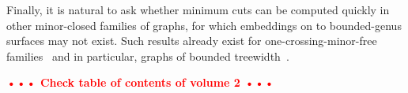\documentclass[natbib]{svcyclop}
\def\NOTE#1{\textcolor{Red}{\textbf{\textsf{••• #1 •••}}}}
\begin{document}
Finally, it is natural to ask whether minimum cuts can be computed quickly in other minor-closed families of graphs, for which embeddings on to bounded-genus surfaces may not exist.
Such results already exist for one-crossing-minor-free families~\cite{ce-fog-13} and in particular, graphs of bounded treewidth~\cite{hknr-cmfnc-98}.



\CrossRef

\NOTE{Check table of contents of volume 2}


\nocite{bk-amfdp-09, hkrs-fspap-97, k-msspp-05, r-mstcp-83, insw-iamcmf-11, multishort, parshort, splitting, gohog, optcycles, surflow, surfcut, homcover, global, e-dgteg-03, c-scgsp-10, p-deeoc-13}


%

\end{document}
